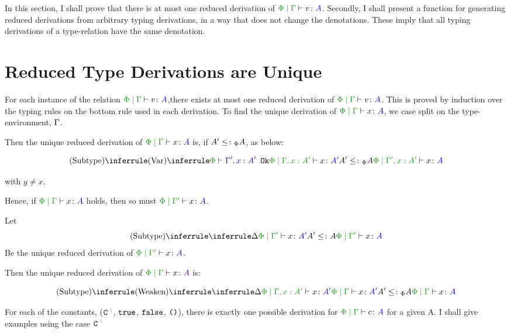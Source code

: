 \documentclass{report}
\begin{document}
    In this section, I shall prove that there is at most one reduced derivation of $\gpetyperelation{v}{A}$. Secondly, I shall present a function for generating reduced derivations from arbitrary typing derivations, in a way that does not change the denotations. These imply that all typing derivations of a type-relation have the same denotation.
    
    \section{Reduced Type Derivations are Unique}
    For each instance of the relation $\gpetyperelation{v}{A}$,there exists at most one reduced derivation of  $\gpetyperelation{v}{A}$. This is proved by induction over the typing rules on the bottom rule used in each derivation.
    To find the unique derivation of $\gpetyperelation{x}{A}$, we case split on the type-environment, $\Gamma$.
    
    Then the unique reduced derivation of $\gpetyperelation{x}{A}$ is, if $A' \leq\colon_\Phi A$, as below:
    
    \begin{equation}
        \ntreeruleII{Subtype}{\ntreeruleI{Var}{\wellformedok{\P}{\G', x: A'}}{\etyperelation{\P}{\G,x: A'}{x}{A'}}}{ A' \subtypep A}{\etyperelation{\P}{\G', x: A'}{x}{A}}
    \end{equation}
    
     with $y \neq x$.
    
    Hence, if $\gpetyperelation{x}{A}$ holds, then so must $\etyperelation{\P}{\G'}{x}{A}$.
    
    Let 
    \begin{equation}
        \edeltavrule{\P}{\G'}{x}{A'}{A}
    \end{equation}
    Be the  unique reduced derivation of $\etyperelation{\P}{\G'}{x}{A}$.
    
    Then the unique reduced derivation of $\gpetyperelation{x}{A}$ is:
    
    
    \begin{equation}
        \ntreeruleII{Subtype}{
            \ntreeruleI{Weaken}{
                \treeruleI{\D}{\etyperelation{\P}{\G, x: A'}{x}{A'}}
            }{\gpetyperelation{x}{A'}}   
        }{ A' \subtypep A
        }{\gpetyperelation{x}{A}}
    \end{equation}
    
    For each of the constants, ($\const{A}$, $\texttt{true}$, $\texttt{false}$, $\texttt{()}$), there is exactly one possible derivation for $\etyperelation{\P}{\G}{c}{A}$ for a given A. I shall give examples using the case $\const{A}$
    
\end{document}
